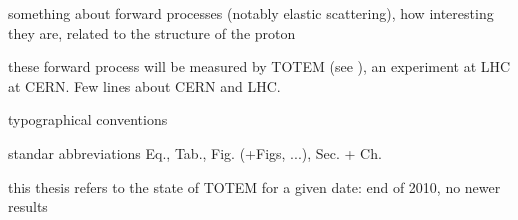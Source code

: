 \def\CaptionPrefix{I.}

\> something about forward processes (notably elastic scattering), how interesting they are, related to the structure of the proton

\> these forward process will be measured by TOTEM (see ), an experiment at LHC at CERN. Few lines about CERN and LHC.

\> typographical conventions

\centerline{\vbox{}}

\> standar abbreviations Eq., Tab., Fig. (+Figs, ...), Sec. + Ch.

\> this thesis refers to the state of TOTEM for a given date: end of 2010, no newer results

\def\CaptionPrefix{\currentChapterNumber.}
